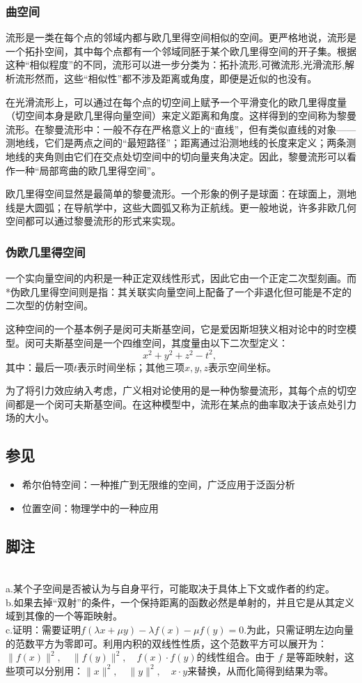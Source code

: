 \subsubsection{曲空间}
流形是一类在每个点的邻域内都与欧几里得空间相似的空间。更严格地说，流形是一个拓扑空间，其中每个点都有一个邻域同胚于某个欧几里得空间的开子集。根据这种“相似程度”的不同，流形可以进一步分类为：拓扑流形,可微流形,光滑流形,解析流形然而，这些“相似性”都不涉及距离或角度，即便是近似的也没有。

在光滑流形上，可以通过在每个点的切空间上赋予一个平滑变化的欧几里得度量（切空间本身是欧几里得向量空间）来定义距离和角度。这样得到的空间称为黎曼流形。在黎曼流形中：一般不存在严格意义上的“直线”，但有类似直线的对象——测地线，它们是两点之间的“最短路径”；距离通过沿测地线的长度来定义；两条测地线的夹角则由它们在交点处切空间中的切向量夹角决定。因此，黎曼流形可以看作一种“局部弯曲的欧几里得空间”。

欧几里得空间显然是最简单的黎曼流形。一个形象的例子是球面：在球面上，测地线是大圆弧；在导航学中，这些大圆弧又称为正航线。更一般地说，许多非欧几何空间都可以通过黎曼流形的形式来实现。
\subsubsection{伪欧几里得空间}
一个实向量空间的内积是一种正定双线性形式，因此它由一个正定二次型刻画。而*伪欧几里得空间则是指：其关联实向量空间上配备了一个非退化但可能是不定的二次型的仿射空间。

这种空间的一个基本例子是闵可夫斯基空间，它是爱因斯坦狭义相对论中的时空模型。闵可夫斯基空间是一个四维空间，其度量由以下二次型定义：
$$
x^2 + y^2 + z^2 - t^2,~
$$
其中：最后一项$t$表示时间坐标；其他三项$x, y, z$表示空间坐标。

为了将引力效应纳入考虑，广义相对论使用的是一种伪黎曼流形，其每个点的切空间都是一个闵可夫斯基空间。在这种模型中，流形在某点的曲率取决于该点处引力场的大小。
\subsection{参见}
\begin{itemize}
\item 希尔伯特空间：一种推广到无限维的空间，广泛应用于泛函分析
\item 位置空间：物理学中的一种应用
\end{itemize}
\subsection{脚注}\\
a.某个子空间是否被认为与自身平行，可能取决于具体上下文或作者的约定。\\
b.如果去掉“双射”的条件，一个保持距离的函数必然是单射的，并且它是从其定义域到其像的一个等距映射。\\
c.证明：需要证明$f(\lambda x + \mu y) - \lambda f(x) - \mu f(y) = 0$.为此，只需证明左边向量的范数平方为零即可。利用内积的双线性性质，这个范数平方可以展开为：$\|f(x)\|^2, \quad \|f(y)\|^2, \quad f(x) \cdot f(y)$的线性组合。由于 $f$ 是等距映射，这些项可以分别用：$\|x\|^2, \quad \|y\|^2, \quad x \cdot y$来替换，从而化简得到结果为零。
